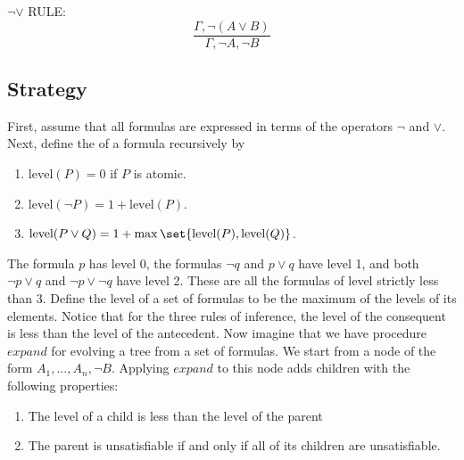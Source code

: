 $\neg\lor$ RULE: $$\frac{\Gamma, \neg(A \lor B)}{\Gamma, \neg A, \neg B} $$ 



\subsection{Strategy}


First, assume that all formulas are expressed in terms of the operators $\neg$ and $\lor$.  Next, define the  of a formula recursively by 

\begin{enumerate}

\item $\text{level}(P) = 0$ if $P$ is atomic.

\item  $\text{level}(\neg P) = 1 + \text{level}(P)$.

\item  $\text{level}(P \lor Q) = 1 + \max \set{\text{level}(P), \text{level}(Q)}$.

\end{enumerate}


The formula  $p$ has level 0, the formulas $\neg q$ and $p \lor q$ have  level 1, and both $\neg p \lor q$ and $\neg p \lor \neg q$ have level 2.  These are all the formulas of level strictly less than 3.  Define the level of a set of formulas to be the maximum of the levels of its elements.  Notice that for the three rules of inference, the level of the consequent is less than the level of the antecedent. Now imagine that we have procedure $expand$ for evolving a tree from a set of formulas. We start from a node of the form $A_1, \ldots, A_n, \neg B$.  Applying $expand$ to this node adds children with the following properties:

\begin{enumerate}
  \item The level of a child is less than the level of the parent
 \item  The parent is unsatisfiable if and only if all of its children are unsatisfiable.
\end{enumerate}

